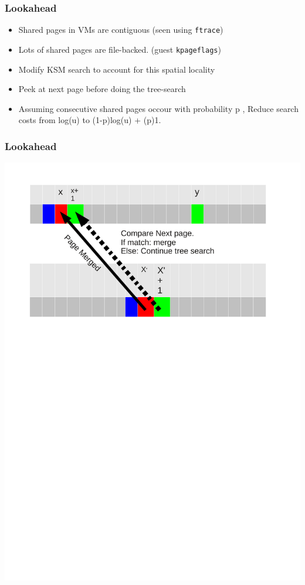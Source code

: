 \documentclass{beamer}
\begin{document}
\begin{frame}
  \frametitle{Lookahead}
  \begin{itemize}
  \item Shared pages in VMs are contiguous (seen using \texttt{ftrace})
  \item Lots of shared pages are file-backed. (guest \texttt{kpageflags})
  \item Modify KSM search to account for this spatial locality
  \item \alert{Peek at next page before doing the tree-search}
  \item Assuming consecutive shared pages occour with probability  p , Reduce search costs from log(u) to (1-p)log(u) + (p)1.
  \end{itemize}
\end{frame}


\begin{frame}
  \frametitle{Lookahead}
\includegraphics[scale=0.6]{Lookahead.pdf}
\end{frame}
\end{document}
